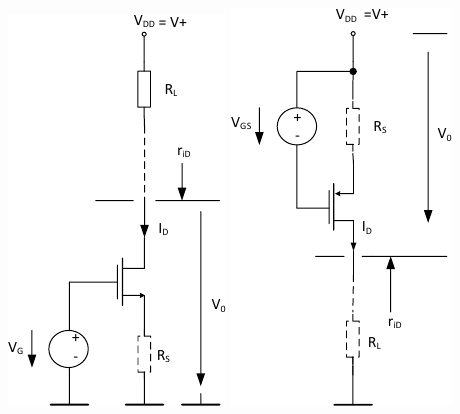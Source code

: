 \begin{minipage}[t]{0.44\columnwidth}
    \includegraphics[width=0.48\columnwidth, align=t]{images/05_stromquelle_einfach_NMOS.pdf}
    \includegraphics[width=0.48\columnwidth, align=t]{images/05_stromquelle_einfach_PMOS.pdf}
\end{minipage}
\hfill
